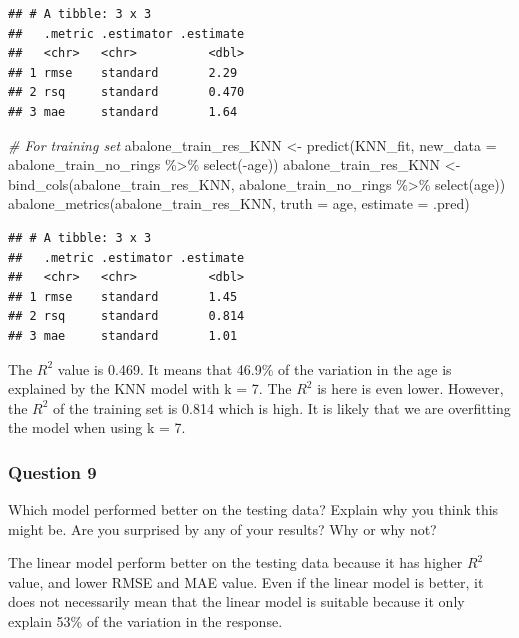 \documentclass[
]{article}
\newenvironment{Shaded}{\begin{snugshade}}{\end{snugshade}}
\newcommand{\AttributeTok}[1]{\textcolor[rgb]{0.77,0.63,0.00}{#1}}
\newcommand{\CommentTok}[1]{\textcolor[rgb]{0.56,0.35,0.01}{\textit{#1}}}
\newcommand{\FunctionTok}[1]{\textcolor[rgb]{0.00,0.00,0.00}{#1}}
\newcommand{\NormalTok}[1]{#1}
\newcommand{\OtherTok}[1]{\textcolor[rgb]{0.56,0.35,0.01}{#1}}
\newcommand{\SpecialCharTok}[1]{\textcolor[rgb]{0.00,0.00,0.00}{#1}}
\begin{document}
\begin{verbatim}
## # A tibble: 3 x 3
##   .metric .estimator .estimate
##   <chr>   <chr>          <dbl>
## 1 rmse    standard       2.29 
## 2 rsq     standard       0.470
## 3 mae     standard       1.64
\end{verbatim}

\begin{Shaded}
\begin{Highlighting}[]
\CommentTok{\# For training set}
\NormalTok{abalone\_train\_res\_KNN }\OtherTok{\textless{}{-}} \FunctionTok{predict}\NormalTok{(KNN\_fit, }\AttributeTok{new\_data =}\NormalTok{ abalone\_train\_no\_rings }\SpecialCharTok{\%\textgreater{}\%} \FunctionTok{select}\NormalTok{(}\SpecialCharTok{{-}}\NormalTok{age))}
\NormalTok{abalone\_train\_res\_KNN }\OtherTok{\textless{}{-}} \FunctionTok{bind\_cols}\NormalTok{(abalone\_train\_res\_KNN, abalone\_train\_no\_rings }\SpecialCharTok{\%\textgreater{}\%} \FunctionTok{select}\NormalTok{(age))}
\FunctionTok{abalone\_metrics}\NormalTok{(abalone\_train\_res\_KNN, }\AttributeTok{truth =}\NormalTok{ age, }\AttributeTok{estimate =}\NormalTok{ .pred)}
\end{Highlighting}
\end{Shaded}

\begin{verbatim}
## # A tibble: 3 x 3
##   .metric .estimator .estimate
##   <chr>   <chr>          <dbl>
## 1 rmse    standard       1.45 
## 2 rsq     standard       0.814
## 3 mae     standard       1.01
\end{verbatim}

The \(R^2\) value is 0.469. It means that 46.9\% of the variation in the
age is explained by the KNN model with k = 7. The \(R^2\) is here is
even lower. However, the \(R^2\) of the training set is 0.814 which is
high. It is likely that we are overfitting the model when using k = 7.

\hypertarget{question-9}{%
\subsubsection{Question 9}\label{question-9}}

Which model performed better on the testing data? Explain why you think
this might be. Are you surprised by any of your results? Why or why not?

The linear model perform better on the testing data because it has
higher \(R^2\) value, and lower RMSE and MAE value. Even if the linear
model is better, it does not necessarily mean that the linear model is
suitable because it only explain 53\% of the variation in the response.
\end{document}
